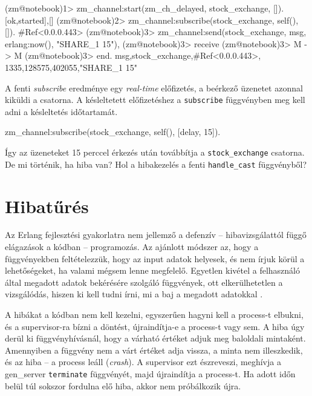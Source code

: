 \documentclass[12pt, a4paper, oneside]{book}
\begin{document}
\begin{code}{}{}
(zm@notebook)1> zm_channel:start(zm_ch_delayed, 
                                 stock_exchange, []).
{[{ok,started}],[]}
(zm@notebook)2> zm_channel:subscribe(stock_exchange, 
                                     self(), []).   
#Ref<0.0.0.443>
(zm@notebook)3> zm_channel:send(stock_exchange, 
                      {msg, {erlang:now(), "SHARE_1 15"}}),
(zm@notebook)3> receive
(zm@notebook)3> M -> M
(zm@notebook)3> end.
{msg,{stock_exchange,#Ref<0.0.0.443>},
     {{1335,128575,402055},"SHARE_1 15"}}
\end{code}

A fenti \emph{subscribe} eredménye egy \emph{real-time} előfizetés, a beérkező
üzenetet azonnal kiküldi a csatorna. A késleltetett előfizetéshez a
\texttt{subscribe} függvényben meg kell adni a késleltetés időtartamát.

\begin{code}{}{}
zm_channel:subscribe(stock_exchange, self(), [{delay, 15}]).
\end{code}

Így az üzeneteket 15 perccel érkezés után továbbítja a \texttt{stock\_exchange}
csatorna. De mi történik, ha hiba van? Hol a hibakezelés a fenti
\texttt{handle\_cast} függvényből?

\section{Hibatűrés}
Az Erlang fejlesztési gyakorlatra nem jellemző a defenzív -- hibavizsgálattól
függő elágazások a kódban -- programozás. Az ajánlott módszer az, hogy a
függvényekben feltételezzük, hogy az input adatok helyesek, és nem írjuk körül
a lehetőségeket, ha valami mégsem lenne megfelelő. Egyetlen kivétel a
felhasználó által megadott adatok bekérésére szolgáló függvények, ott
elkerülhetetlen a vizsgálódás, hiszen ki kell tudni írni, mi a baj a megadott
adatokkal \citep{ArmstrongThesis}.

A hibákat a kódban nem kell kezelni, egyszerűen hagyni kell a process-t
elbukni, és a supervisor-ra bízni a döntést, újraindítja-e a process-t vagy
sem. A hiba úgy derül ki függvényhívásnál, hogy a várható értéket adjuk meg
baloldali mintaként. Amennyiben a függvény nem a várt értéket adja vissza, a
minta nem illeszkedik, és az hiba -- a process leáll (\emph{crash}). A
supervisor ezt észreveszi, meghívja a gen\_server \texttt{terminate}
függvényét, majd újraindítja a process-t. Ha adott időn belül túl sokszor
fordulna elő hiba, akkor nem próbálkozik újra.
\end{document}
